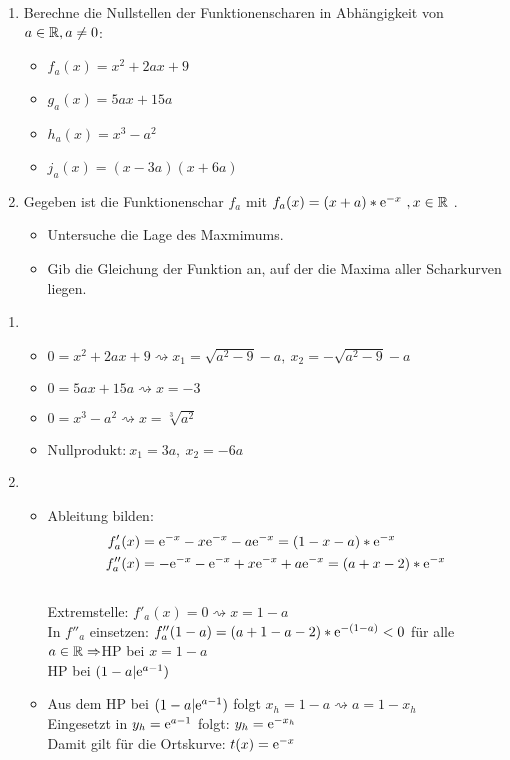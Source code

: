 \begin{enumerate}
  \item Berechne die Nullstellen der Funktionenscharen in Abhängigkeit von $a\in \mathbb{R}, a\neq 0$:
  \begin{multicols}{2}
  \begin{itemize}
    \item $f_a(x)=x^2+2ax+9$
    \item $g_a(x)=5ax+15a$
    \item $h_a(x)=x^3-a^2$
    \item $j_a(x)=(x-3a)(x+6a)$
  \end{itemize}
  \end{multicols}
  \item Gegeben ist die Funktionenschar $f_a$ mit $f_a(x)=(x+a)*\mathrm{e}^{-x}\ , x\in \mathbb{R}$ .
  \begin{itemize}
    \item Untersuche die Lage des Maxmimums.
    \item Gib die Gleichung der Funktion an, auf der die Maxima aller Scharkurven liegen.
  \end{itemize}
\end{enumerate}
\begin{lsg}{}
	\begin{enumerate}
		\item \begin{itemize}
			\item $0=x^2+2ax+9 \rightsquigarrow x_1=\sqrt{a^2-9}-a,\ x_2=-\sqrt{a^2-9}-a$\\
			\item $0=5ax+15a \rightsquigarrow x=-3$\\
			\item $0=x^3-a^2 \rightsquigarrow x=\sqrt[3]{a^2}$\\
			\item $\text{Nullprodukt:}\ x_1=3a,\ x_2=-6a$
		\end{itemize}
		\item \begin{itemize}
			\item Ableitung bilden: \begin{align*}
				f'_a(x)&=\mathrm{e}^{-x}-x\mathrm{e}^{-x}-a\mathrm{e}^{-x}=(1-x-a)*\mathrm{e}^{-x}\\
				f''_a(x)&=-\mathrm{e}^{-x}-\mathrm{e}^{-x}+x\mathrm{e}^{-x}+a\mathrm{e}^{-x}=(a+x-2)*\mathrm{e}^{-x}
			\end{align*}\\
			Extremstelle: $f'_a(x)=0 \rightsquigarrow x=1-a$ \\
			In $f''_a$ einsetzen: $f''_a(1-a)=(a+1-a-2)*\mathrm{e}^{-(1-a)}<0$ für alle $a\in \mathbb{R}\Rightarrow $HP bei $x=1-a$\\
			HP bei $(1-a|\mathrm{e}^{a-1})$
			\item Aus dem HP bei $(1-a|\mathrm{e}^{a-1})$ folgt $x_{h}=1-a \rightsquigarrow a=1-x_{h}$\\
			Eingesetzt in $y_{h}=\mathrm{e}^{a-1}$ folgt: $y_h=\mathrm{e}^{-x_h}$ \\
			Damit gilt für die Ortskurve: $t(x)=\mathrm{e}^{-x}$

		\end{itemize}

	\end{enumerate}
\end{lsg}
